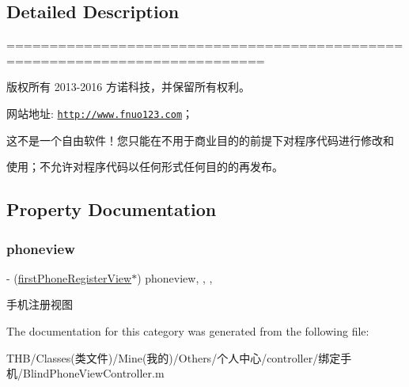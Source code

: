 \subsection{Detailed Description}
============================================================================

版权所有 2013-\/2016 方诺科技，并保留所有权利。

网站地址\+: \href{http://www.fnuo123.com}{\tt http\+://www.\+fnuo123.\+com}； 



这不是一个自由软件！您只能在不用于商业目的的前提下对程序代码进行修改和

使用；不允许对程序代码以任何形式任何目的的再发布。 

 

\subsection{Property Documentation}
\mbox{\label{category_blind_phone_view_controller_07_08_af8e2549203aadacb62c803257a8bd0c3}} 
\subsubsection{\texorpdfstring{phoneview}{phoneview}}
{\footnotesize\ttfamily -\/ (\mbox{\hyperlink{interfacefirst_phone_register_view}{first\+Phone\+Register\+View}}$\ast$) phoneview\hspace{0.3cm}{\ttfamily [read]}, {\ttfamily [write]}, {\ttfamily [nonatomic]}, {\ttfamily [strong]}}

手机注册视图 

The documentation for this category was generated from the following file\+:\begin{DoxyCompactItemize}
\item 
T\+H\+B/\+Classes(类文件)/\+Mine(我的)/\+Others/个人中心/controller/绑定手机/Blind\+Phone\+View\+Controller.\+m\end{DoxyCompactItemize}
